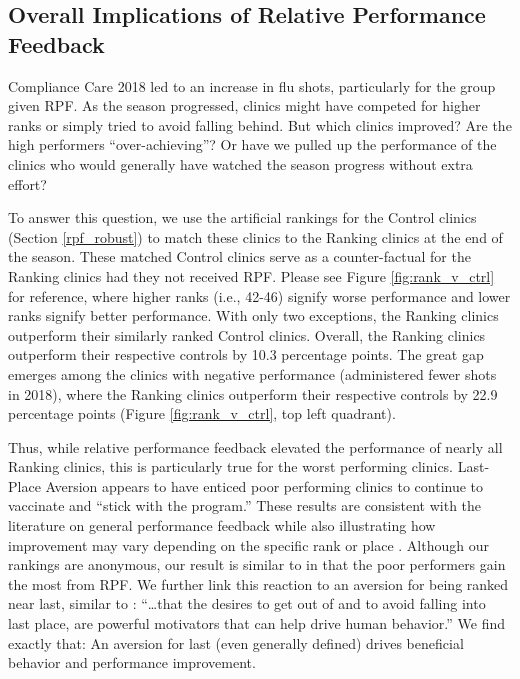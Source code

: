\begin{onehalfspace}
 \subsection{Overall Implications of Relative Performance Feedback}
 Compliance Care 2018 led to an increase in flu shots, particularly for the group given RPF. As the season progressed, clinics might have competed for higher ranks or simply tried to avoid falling behind. But which clinics improved? Are the high performers “over-achieving”? Or have we pulled up the performance of the clinics who would generally have watched the season progress without extra effort?
 
 To answer this question, we use the artificial rankings for the Control clinics (Section \ref{rpf_robust}) to match these clinics to the Ranking clinics at the end of the season. These matched Control clinics serve as a counter-factual for the Ranking clinics had they not received RPF. Please see Figure \ref{fig:rank_v_ctrl} for reference, where higher ranks (i.e., 42-46) signify worse performance and lower ranks signify better performance. With only two exceptions, the Ranking clinics outperform their similarly ranked Control clinics. Overall, the Ranking clinics outperform their respective controls by 10.3 percentage points. The great gap emerges among the clinics with negative performance (administered fewer shots in 2018), where the Ranking clinics outperform their respective controls by 22.9 percentage points (Figure \ref{fig:rank_v_ctrl}, top left quadrant).  
 
 Thus, while relative performance feedback elevated the performance of nearly all Ranking clinics, this is particularly true for the worst performing clinics. Last-Place Aversion appears to have enticed poor performing clinics to continue to vaccinate and “stick with the program.” These results are consistent with the literature on general performance feedback \citep[e.g.,][]{Kuhnen2012,Charness2014} while also illustrating how improvement may vary depending on the specific rank or place \citep{Gill2019}. Although our rankings are anonymous, our result is similar to \cite{Song2018a} in that the poor performers gain the most from RPF. We further link this reaction to an aversion for being ranked near last, similar to \cite[p. 35]{Buell2021}: “…that the desires to get out of and to avoid falling into last place, are powerful motivators that can help drive human behavior.” We find exactly that: An aversion for last (even generally defined) drives beneficial behavior and performance improvement.
 

\end{onehalfspace}

